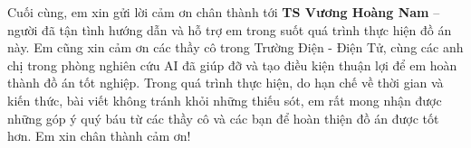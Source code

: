 Cuối cùng, em xin gửi lời cảm ơn chân thành tới \textbf{TS Vương Hoàng Nam} – người đã tận tình hướng dẫn và hỗ trợ em trong suốt quá trình thực hiện đồ án này. Em cũng xin cảm ơn các thầy cô trong Trường Điện - Điện Tử, cùng các anh chị trong phòng nghiên cứu AI đã giúp đỡ và tạo điều kiện thuận lợi để em hoàn thành đồ án tốt nghiệp. Trong quá trình thực hiện, do hạn chế về thời gian và kiến thức, bài viết không tránh khỏi những thiếu sót, em rất mong nhận được những góp ý quý báu từ các thầy cô và các bạn để hoàn thiện đồ án được tốt hơn. Em xin chân thành cảm ơn!


